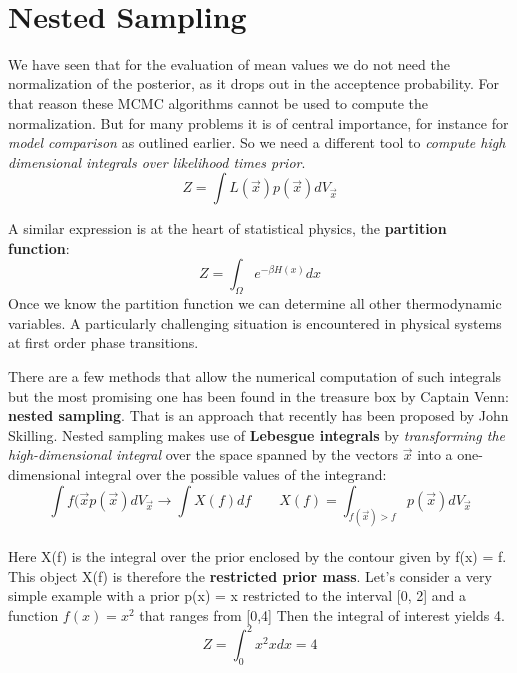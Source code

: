 \documentclass[12pt, a4paper]{scrartcl}
\begin{document}
\\

\section*{Nested Sampling}
We have seen that for the evaluation of mean values we do not need the
normalization of the posterior, as it drops out in the acceptence probability. For that reason these MCMC algorithms cannot be used to compute the normalization.
But for many problems it is of central importance, for instance for \textit{model comparison}
as outlined earlier. So we need a diﬀerent tool to \textit{compute high dimensional
integrals over likelihood times prior}.
\[Z=\int L(\Vec{x})p(\vec{x})dV_{\vec{x}}\]

A similar expression is at the heart of statistical physics, the  \textbf{partition function}:
\[Z=\int_{\Omega} e^{-\beta H(x)}dx\]
Once we know the partition function we can determine all other thermodynamic
variables. A particularly challenging situation is encountered in physical systems at ﬁrst order phase transitions.

There are a few methods that allow the numerical computation of such integrals but the most promising one has been found in the treasure box by Captain Venn:  \textbf{nested sampling}. That is an approach that recently has been proposed by John Skilling.
Nested sampling makes use of  \textbf{Lebesgue integrals} by \textit{transforming the high-dimensional integral} over the space spanned by the vectors $\vec{x}$ into a one-dimensional integral over the possible values of the integrand:
\begin{equation*}\boxed{\int f(\vec{x}p(\vec{x})dV_{\Vec{x}} \rightarrow \int X(f)df \qquad X(f)=\int_{f(\vec{x})>f}p(\vec{x})dV_{\vec{x}}
}\end{equation*}\\

Here X(f) is the integral over the prior enclosed by the contour given by f(x) = f.
This object X(f) is therefore the  \textbf{restricted prior mass}. Let’s consider a very simple
example with a prior p(x) = x restricted to the interval [0, 2] and a function $f(x) = x^2$ that ranges from [0,4]
Then the integral of interest yields 4.
\[Z=\int_0^2x^2xdx=4\]
\end{document}
